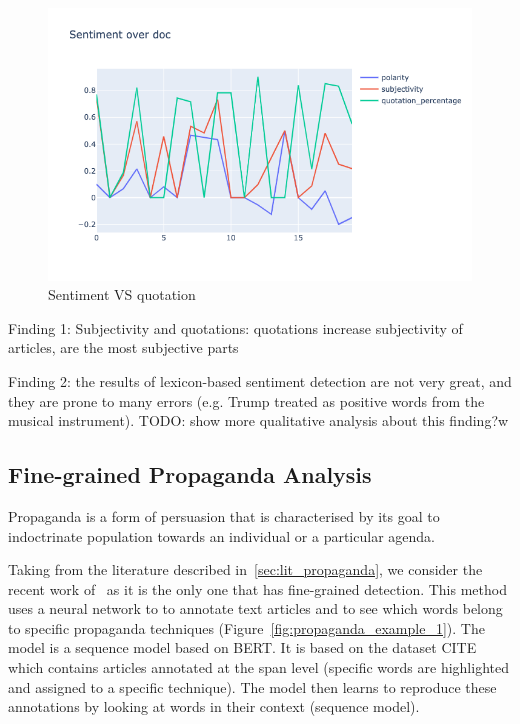 \begin{figure}[!htbp]
    \centering
    \includegraphics[width=\linewidth]{figures/sentiment_vs_quotation.png}
    \caption{Sentiment VS quotation}
    \label{fig:sentiment_vs_quotation}
\end{figure}


Finding 1:
Subjectivity and quotations: quotations increase subjectivity of articles, are the most subjective parts

Finding 2: the results of lexicon-based sentiment detection are not very great, and they are prone to many errors (e.g. Trump treated as positive words from the musical instrument).
TODO: show more qualitative analysis about this finding?w

\subsection{\statusorange Fine-grained Propaganda Analysis}
\label{ssec:lp_techniques_propaganda}

Propaganda is a form of persuasion that is characterised by its goal to indoctrinate population towards an individual or a particular agenda.

Taking from the literature described in~\ref{sec:lit_propaganda}, we consider the recent work of~\cite{da2019fine} as it is the only one that has fine-grained detection. This method uses a neural network to to annotate text articles and to see which words belong to specific propaganda techniques (Figure~\ref{fig:propaganda_example_1}).
The model is a sequence model based on BERT. It is based on the dataset CITE which contains articles annotated at the span level (specific words are highlighted and assigned to a specific technique). The model then learns to reproduce these annotations by looking at words in their context (sequence model).

